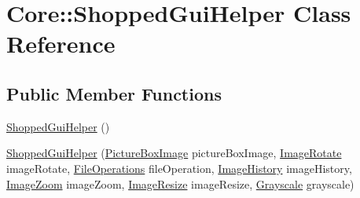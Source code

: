 \hypertarget{class_core_1_1_shopped_gui_helper}{
\section{Core::ShoppedGuiHelper Class Reference}
\label{class_core_1_1_shopped_gui_helper}
}
\subsection*{Public Member Functions}
\begin{DoxyCompactItemize}
\item 
\hyperlink{class_core_1_1_shopped_gui_helper_a97f481d806becab3321f15c88e213da2}{ShoppedGuiHelper} ()
\item 
\hyperlink{class_core_1_1_shopped_gui_helper_ad0f25ffda7396726346d265f203d9d14}{ShoppedGuiHelper} (\hyperlink{class_core_1_1_images_1_1_picture_box_image}{PictureBoxImage} pictureBoxImage, \hyperlink{class_core_1_1_image_rotate}{ImageRotate} imageRotate, \hyperlink{class_core_1_1_file_operations}{FileOperations} fileOperation, \hyperlink{class_core_1_1_image_history}{ImageHistory} imageHistory, \hyperlink{class_core_1_1_image_zoom}{ImageZoom} imageZoom, \hyperlink{class_core_1_1_image_resize}{ImageResize} imageResize, \hyperlink{class_core_1_1_grayscale}{Grayscale} grayscale)
\end{DoxyCompactItemize}
